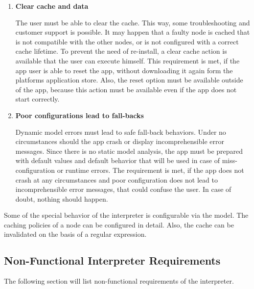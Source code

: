 \begin{enumerate}
	\item \textbf{Clear cache and data}
	
	The user must be able to clear the cache.
	This way, some troubleshooting and customer support is possible.
	It may happen that a faulty node is cached that is not compatible with the other nodes, or is not configured with a correct cache lifetime.
	To prevent the need of re-install, a clear cache action is available that the user can execute himself.
	This requirement is met, if the app user is able to reset the app, without downloading it again form the platforms application store.
	Also, the reset option must be available outside of the app, because this action must be available even if the app does not start correctly.
	
	\item \textbf{Poor configurations lead to fall-backs}
	
	Dynamic model errors must lead to safe fall-back behaviors.
	Under no circumstances should the app crash or display incomprehensible error messages.
	Since there is no static model analysis, the app must be prepared with default values and default behavior that will be used in case of miss-configuration or runtime errors.
	The requirement is met, if the app does not crash at any circumstances and poor configuration does not lead to incomprehensible error messages, that could confuse the user.
	In case of doubt, nothing should happen.
\end{enumerate}

Some of the special behavior of the interpreter is configurable via the model.
The caching policies of a node can be configured in detail.
Also, the cache can be invalidated on the basis of a regular expression.

\subsection{Non-Functional Interpreter Requirements}
\label{nonfunctionalinterpreterrequirements}

The following section will list non-functional requirements of the interpreter.

